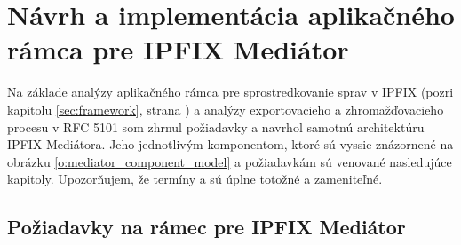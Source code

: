 \section{Návrh a implementácia aplikačného rámca pre IPFIX Mediátor}

Na základe analýzy aplikačného rámca pre sprostredkovanie sprav v IPFIX (pozri kapitolu \ref{sec:framework}, 
strana \pageref{sec:framework}) a analýzy exportovacieho a zhromažďovacieho procesu v RFC 5101
\citep{rfc5101} som zhrnul požiadavky a navrhol samotnú architektúru IPFIX Mediátora. 
Jeho jednotlivým komponentom, ktoré sú vyssie znázornené na obrázku \ref{o:mediator_component_model} 
a požiadavkám sú venované nasledujúce kapitoly. Upozorňujem, že termíny  a 
 sú úplne totožné a zameniteľné.


\subsection{Požiadavky na rámec pre IPFIX Mediátor}

